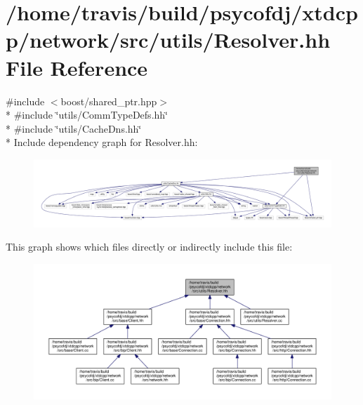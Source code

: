 \hypertarget{Resolver_8hh}{\section{/home/travis/build/psycofdj/xtdcpp/network/src/utils/\-Resolver.hh File Reference}
\label{Resolver_8hh}
}
{\ttfamily \#include $<$boost/shared\-\_\-ptr.\-hpp$>$}\\*
{\ttfamily \#include \char`\"{}utils/\-Comm\-Type\-Defs.\-hh\char`\"{}}\\*
{\ttfamily \#include \char`\"{}utils/\-Cache\-Dns.\-hh\char`\"{}}\\*
Include dependency graph for Resolver.\-hh\-:
\nopagebreak
\begin{figure}[H]
\begin{center}
\leavevmode
\includegraphics[width=350pt]{Resolver_8hh__incl}
\end{center}
\end{figure}
This graph shows which files directly or indirectly include this file\-:
\nopagebreak
\begin{figure}[H]
\begin{center}
\leavevmode
\includegraphics[width=350pt]{Resolver_8hh__dep__incl}
\end{center}
\end{figure}
